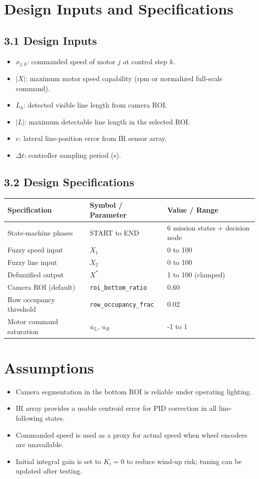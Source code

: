 \documentclass{article}
\begin{document}
\section{Design Inputs and Specifications}
\subsection*{3.1 Design Inputs}
\begin{itemize}
\item $x_{j,k}$: commanded speed of motor $j$ at control step $k$.
\item $|X|$: maximum motor speed capability (rpm or normalized full-scale command).
\item $L_k$: detected visible line length from camera ROI.
\item $|L|$: maximum detectable line length in the selected ROI.
\item $e$: lateral line-position error from IR sensor array.
\item $\Delta t$: controller sampling period (s).
\end{itemize}

\subsection*{3.2 Design Specifications}
\begin{center}
\begin{tabular}{lll}
\toprule
Specification & Symbol / Parameter & Value / Range \\
\midrule
State-machine phases & START to END & 6 mission states + decision node \\
Fuzzy speed input & $X_1$ & 0 to 100 \\
Fuzzy line input & $X_2$ & 0 to 100 \\
Defuzzified output & $X^*$ & 1 to 100 (clamped) \\
Camera ROI (default) & \texttt{roi\_bottom\_ratio} & 0.60 \\
Row occupancy threshold & \texttt{row\_occupancy\_frac} & 0.02 \\
Motor command saturation & $u_L$, $u_R$ & -1 to 1 \\
\bottomrule
\end{tabular}
\end{center}

\section{Assumptions}
\begin{itemize}
\item Camera segmentation in the bottom ROI is reliable under operating lighting.
\item IR array provides a usable centroid error for PID correction in all line-following states.
\item Commanded speed is used as a proxy for actual speed when wheel encoders are unavailable.
\item Initial integral gain is set to $K_i=0$ to reduce wind-up risk; tuning can be updated after testing.
\end{itemize}
\end{document}
